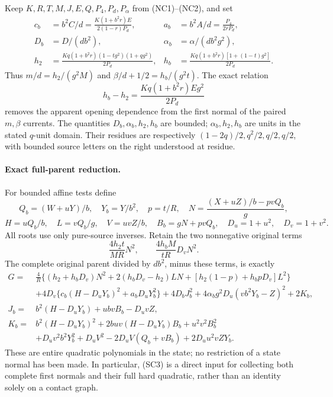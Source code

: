 Keep $K,R,T,M,J,E,Q,P_4,P_d,P_\alpha$ from (NC1)--(NC2), and set
\[
\begin{aligned}
 c_b&=b^2C/d=\frac{K(1+b^2r)E}{2(1-r)P_d},&
 a_b&=b^2A/d=\frac{P_4}{2rP_d},\\
 D_b&=D/(db^2),&\alpha_b&=\alpha/(db^2g^2),\\
 h_2&=\frac{Kq(1+b^2r)(1-tg^2)(1+qg^2)}{2P_d},&
 h_b&=\frac{Kq(1+b^2r)[1+(1-t)g^2]}{2P_d}.
\end{aligned}
\]
Thus $m/d=h_2/(g^2M)$ and $\beta/d+1/2=h_b/(g^2t)$.
The exact relation
\[
 h_b-h_2=\frac{Kq(1+b^2r)E g^2}{2P_d}
 \tag{SC2}
\]
removes the apparent opening dependence from the first normal of the
paired $m,\beta$ currents. The quantities $D_b,\alpha_b,h_2,h_b$ are
bounded; $\alpha_b,h_2,h_b$ are units in the stated $q$-unit domain.
Their residues are respectively $(1-2q)/2,q^2/2,q/2,q/2$, with
bounded source letters on the right understood at residue.

\paragraph{Exact full-parent reduction.}
For bounded affine tests define
\[
 Q_b=(W+uY)/b,\quad Y_b=Y/b^2,\quad p=t/R,\quad
 N=\frac{(X+uZ)/b-pvQ_b}{g},
\]
\[
 H=uQ_b/b,\quad L=vQ_b/g,\quad V=uvZ/b,\quad
 B_b=gN+pvQ_b,\quad D_u=1+u^2,\quad D_v=1+v^2.
\]
All roots use only pure-source inverses. Retain the two nonnegative
original terms
\[
 \frac{4h_2t}{MR}N^2,
 \qquad \frac{4h_bM}{tR}D_vN^2.
\]
The complete original parent divided by $db^2$, minus these terms,
is exactly
\begin{align*}
 G={}&\frac4R\{(h_2+h_bD_v)N^2+2(h_bD_v-h_2)LN
              +[h_2(1-p)+h_bpD_v]L^2\}\\
 &+4D_v\{c_b(H-D_uY_b)^2+a_bD_uY_b^2\}
   +4D_bJ_b^2+4\alpha_b g^2D_u(vb^2Y_b-Z)^2+2K_b,
                                                        \tag{SC3}\\
 J_b={}&b^2(H-D_uY_b)+ubvB_b-D_uvZ,\\
 K_b={}&b^2(H-D_uY_b)^2+2buv(H-D_uY_b)B_b+u^2v^2B_b^2\\
 &+D_uv^2b^2Y_b^2+D_uV^2
       -2D_uV(Q_b+vB_b)+2D_uu^2vZY_b.
\end{align*}
These are entire quadratic polynomials in the state; no restriction
of a state normal has been made. In particular, (SC3) is a direct
input for collecting both complete first normals and their full hard
quadratic, rather than an identity solely on a contact graph.

